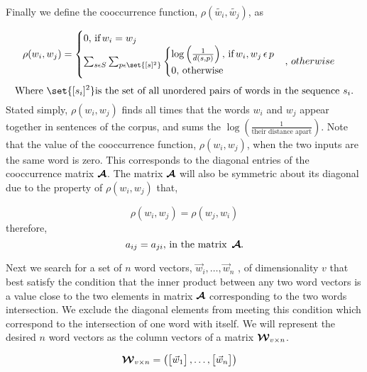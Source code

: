 \documentclass{article}
\begin{document}
Finally we define the cooccurrence function, $\rho(\tilde{w_i}, \tilde{w_j})$, as

\begin{equation*}
\rho(w_i,w_j) = 
\begin{cases}
0, \, \text{if} \, w_i = w_j
\\
\sum_{s \epsilon S} { \sum_{p \epsilon \set{[s]^2} } {
\begin{cases}
\log \left(\frac{1}{d(s,p)} \right), \, \text{if} \, w_i, w_j \, \epsilon \, p
\\
0, \, \text{otherwise}
\end{cases}
} }, \, otherwise
\end{cases}
\end{equation*}
\begin{equation*}
\text{Where } \set{[s_i]^2} \text{is the set of all unordered pairs of words in the sequence } s_i . 
\end{equation*}
Stated simply, $\rho(w_i, w_j)$ finds all times that the words $w_i$ and $w_j$ appear together in sentences of the corpus, and sums the $\log \left( \frac{1}{\text{their distance apart}} \right)$. Note that the value of the cooccurrence function, $\rho(w_i, w_j)$, when the two inputs are the same word is zero. This corresponds to the diagonal entries of the cooccurrence matrix $\boldsymbol{\mathcal{A}}$. The matrix $\boldsymbol{\mathcal{A}}$ will also be symmetric about its diagonal due to the property of $\rho(w_i, w_j)$ that,

\begin{equation*}
\rho(w_i,w_j) = \rho(w_j,w_i)
\end{equation*}
therefore,
\begin{equation*}
a_{ij} = a_{ji}, \, \text{in the matrix } \, \boldsymbol{\mathcal{A}}.
\end{equation*}


Next we search for a set of $n$ word vectors, $\vec{w}_{i},\ldots ,\vec{w}_{n}$ , of dimensionality $v$ that best satisfy the condition that the inner product between any two word vectors is a value close to the two elements in matrix $\boldsymbol{\mathcal{A}}$ corresponding to the two words intersection. We exclude the diagonal elements from meeting this condition which correspond to the intersection of one word with itself. We will represent the desired $n$ word vectors as the column vectors of a matrix $\boldsymbol{\mathcal{W}}_{{v} \times {n}}$.

  \begin{align*}
    \boldsymbol{\mathcal{W}}_{{v} \times {n}} &= \begin{pmatrix}
    	\begin{bmatrix} \vec{w}_{1} \end{bmatrix} , \ldots , \begin{bmatrix} \vec{w}_{n}\end{bmatrix}
	 \end{pmatrix}
  \end{align*}
\end{document}
